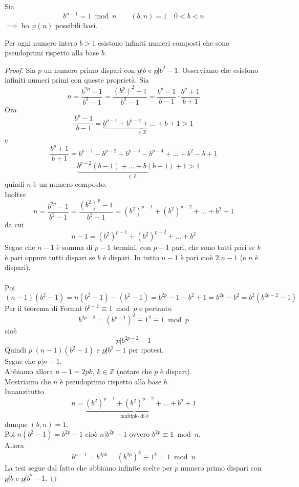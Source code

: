 \documentclass[a4paper,12pt, oneside]{book}
\begin{document}
\begin{osservazione}
	Sia
	$$b^{n-1} = 1 \bmod n \qquad (b,n)=1 \quad 0<b<n$$
	$\implies$ ho $\varphi(n)$ possibili basi.
\end{osservazione}

\begin{teorema}
	Per ogni numero intero $b>1$ esistono infiniti numeri composti che sono pseudoprimi rispetto alla base $b$.

	\begin{proof}
		Sia $p$ un numero primo dispari con $p \not| b$ e $p \not|  b^2-1$. Osserviamo che esistono infiniti numeri primi con queste proprietà.
		Sia\\
		$$n=\frac{ b^{2p} -1 }{b^2 -1} = \frac{ (b^{p})^2 -1 }{b^2 -1} = \frac{b^p - 1}{b-1} \cdot \frac{b^p + 1}{b+1}$$
		Ora
		$$\frac{b^p-1}{b-1} = \underbrace{b^{p-1} + b^{p-2} + \dots + b+1}_{\in \mathbb{Z}} > 1$$
		e
		$$\frac{b^p+1}{b+1} = b^{p-1} - b^{p-2} + b^{p-3} - b^{p-4} + \dots + b^2 -b+1$$
		$$ = \underbrace{b^{p-2}(b-1) + \dots + b(b-1) +1}_{\in \mathbb{Z}} > 1$$
		quindi $n$ è un numero composto.\\
		Inoltre
		$$n=\frac{ b^{2p} -1 }{b^2 -1} = \frac{ (b^{2})^p -1 }{b^2 -1} = (b^2)^{p-1}  + (b^2)^{p-2} + \dots + b^2 +1$$
		da cui
		$$n-1 = (b^2)^{p-1}  + (b^2)^{p-2} + \dots + b^2$$
		Segue che $n-1$ è somma di $p-1$ termini, con $p-1$ pari, che sono tutti pari se $b$ è pari oppure tutti dispari se $b$ è dispari.
		In tutto $n-1$ è pari cioè $2|n-1$ (e $n$ è dispari).\\\\
		Poi
		$$(n-1)(b^2-1) = n(b^2-1) - (b^2-1) = b^{2p} -1-b^2+1=b^{2p} -b^2 = b^2(b^{2p-2} -1)$$
		Per il teorema di Fermat $b^{p-1} \equiv 1 \bmod p$ e pertanto
		$$b^{2p-2} = (b^{p-1})^2 \equiv 1^2 \equiv 1 \bmod p$$
		cioè $$p|b^{2p-2}-1$$
		Quindi $p|(n-1)(b^2 -1)$ e $p \not | b^2 -1$ per ipotesi.\\
		Segue che $p|n-1$.\\
		Abbiamo allora $n-1 = 2pk$, $k \in \mathbb{Z}$ (notare che $p$ è dispari).\\
		Mostriamo che $n$ è pseudoprimo rispetto alla base $b$.\\
		Innanzitutto
		$$n=\underbrace{(b^2)^{p-1} + (b^2)^{p-2}+\dots+b^2}_{\mbox{multiplo di }b}+1$$
		dunque $(b,n)=1$.\\
		Poi $n(b^2-1) = b^{2p}-1$ cioè $n|b^{2p}-1$ ovvero $b^{2p} \equiv 1 \bmod n$.\\
		Allora
		$$b^{n-1} = b^{2pk} = (b^{2p})^k \equiv 1^k = 1 \bmod n$$
		La tesi segue dal fatto che abbiamo infinite scelte per $p$ numero primo dispari con $p \not | b$ e $p \not | b^2 -1$.


	\end{proof}
\end{teorema}
\end{document}

